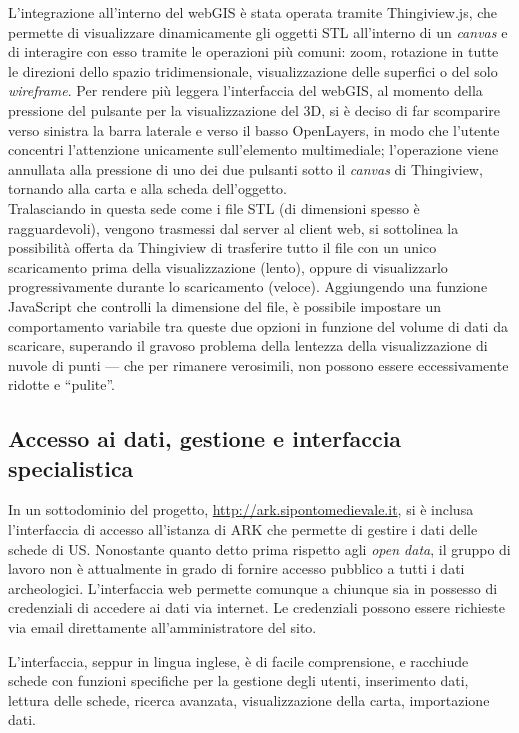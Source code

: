 \documentclass{paper}
\begin{document}
        L'integrazione all'interno del webGIS è stata operata tramite Thingiview.js, che permette di visualizzare dinamicamente gli oggetti STL all'interno di un \textit{canvas} e di interagire con esso tramite le operazioni più comuni: zoom, rotazione in tutte le direzioni dello spazio tridimensionale, visualizzazione delle superfici o del solo \textit{wireframe}. Per rendere più leggera l'interfaccia del webGIS, al momento della pressione del pulsante per la visualizzazione del 3D, si è deciso di far scomparire verso sinistra la barra laterale e verso il basso OpenLayers, in modo che l'utente concentri l'attenzione unicamente sull'elemento multimediale; l'operazione viene annullata alla pressione di uno dei due pulsanti sotto il \textit{canvas} di Thingiview, tornando alla carta e alla scheda dell'oggetto.\\
    
        Tralasciando in questa sede come i file STL (di dimensioni spesso è ragguardevoli), vengono trasmessi dal server al client web, si sottolinea la possibilità offerta da Thingiview di trasferire tutto il file con un unico scaricamento prima della visualizzazione (lento), oppure di visualizzarlo progressivamente durante lo scaricamento (veloce). Aggiungendo una funzione JavaScript che controlli la dimensione del file, è possibile impostare un comportamento variabile tra queste due opzioni in funzione del volume di dati da scaricare, superando il gravoso problema della lentezza della visualizzazione di nuvole di punti --- che per rimanere verosimili, non possono essere eccessivamente ridotte e ``pulite''.

    \subsection{Accesso ai dati, gestione e interfaccia specialistica}

        In un sottodominio del progetto, \url{http://ark.sipontomedievale.it}, si è inclusa l'interfaccia di accesso all'istanza di ARK che permette di gestire i dati delle schede di US. Nonostante quanto detto prima rispetto agli \textit{open data}, il gruppo di lavoro non è attualmente in grado di fornire accesso pubblico a tutti i dati archeologici. L'interfaccia web permette comunque a chiunque sia in possesso di credenziali di accedere ai dati via internet. Le credenziali possono essere richieste via email direttamente all'amministratore del sito.

        L'interfaccia, seppur in lingua inglese, è di facile comprensione, e racchiude schede con funzioni specifiche per la gestione degli utenti, inserimento dati, lettura delle schede, ricerca avanzata, visualizzazione della carta, importazione dati.
\end{document}
